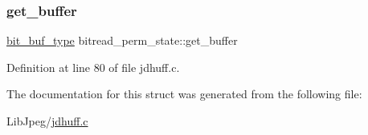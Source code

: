 \subsubsection{\texorpdfstring{get\_buffer}{get\_buffer}}
{\footnotesize\ttfamily \mbox{\hyperlink{jdhuff_8c_ab2d47e546a8ed21c68e22f54535574a8}{bit\+\_\+buf\+\_\+type}} bitread\+\_\+perm\+\_\+state\+::get\+\_\+buffer}



Definition at line 80 of file jdhuff.\+c.



The documentation for this struct was generated from the following file\+:\begin{DoxyCompactItemize}
\item 
Lib\+Jpeg/\mbox{\hyperlink{jdhuff_8c}{jdhuff.\+c}}\end{DoxyCompactItemize}
